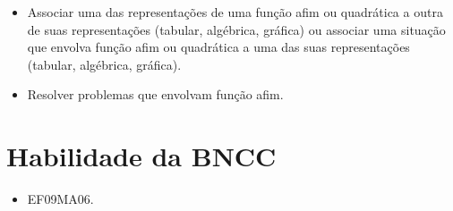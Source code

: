 \begin{itemize}
  \item Associar uma das representações de uma função afim ou quadrática a
outra de suas representações (tabular, algébrica, gráfica) ou associar uma
situação que envolva função afim ou quadrática a uma das suas
representações (tabular, algébrica, gráfica).
  \item Resolver problemas que envolvam função afim.  
\end{itemize} 

\section*{Habilidade da BNCC}

\begin{itemize}
  \item EF09MA06.
\end{itemize}

